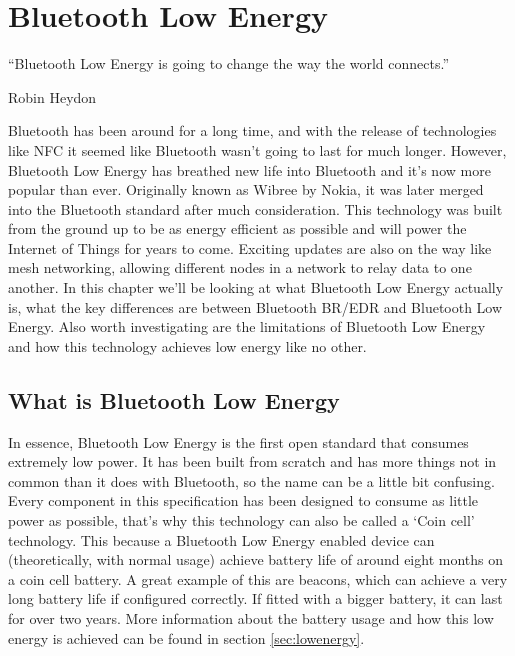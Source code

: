 \documentclass[pdftex,a4paper,12pt,twoside]{report}
\begin{document}


\chapter{Bluetooth Low Energy}
\label{ch:ble}
\epigraph{``Bluetooth Low Energy is going to change the way the world connects.''}{Robin Heydon}
Bluetooth has been around for a long time, and with the release of technologies like NFC it seemed like Bluetooth wasn't going to last for much longer. However, Bluetooth Low Energy has breathed new life into Bluetooth and it's now more popular than ever. Originally known as Wibree by Nokia, it was later merged into the Bluetooth standard after much consideration. This technology was built from the ground up to be as energy efficient as possible and will power the Internet of Things for years to come. Exciting updates are also on the way like mesh networking, allowing different nodes in a network to relay data to one another. In this chapter we'll be looking at what Bluetooth Low Energy actually is, what the key differences are between Bluetooth BR/EDR and Bluetooth Low Energy. Also worth investigating are the limitations of Bluetooth Low Energy and how this technology achieves low energy like no other.

\newpage{}

\section{What is Bluetooth Low Energy}
\label{sec:whatis}
In essence, Bluetooth Low Energy is the first open standard that consumes extremely low power. It has been built from scratch and has more things not in common than it does with Bluetooth, so the name can be a little bit confusing. Every component in this specification has been designed to consume as little power as possible, that's why this technology can also be called a `Coin cell' technology. This because a Bluetooth Low Energy enabled device can (theoretically, with normal usage) achieve battery life of around eight months on a coin cell battery. A great example of this are beacons, which can achieve a very long battery life if configured correctly. If fitted with a bigger battery, it can last for over two years. More information about the battery usage and how this low energy is achieved can be found in section \ref{sec:lowenergy}.
\end{document}
